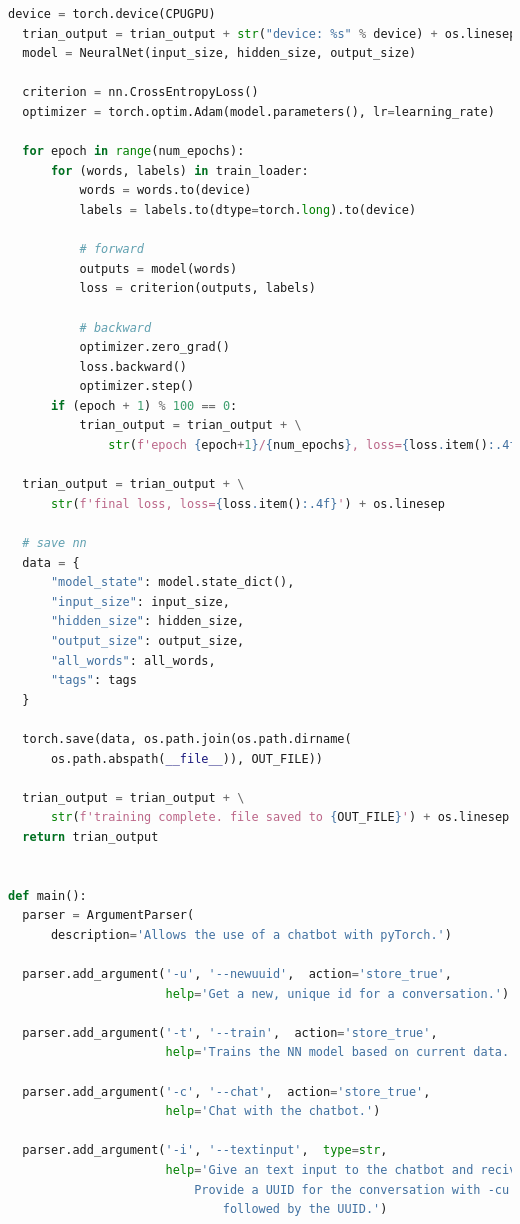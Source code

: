 \documentclass[12pt,oneside,titlepage,listof=totoc,bibliography=totoc]{scrartcl}
\begin{document}
\begin{appendices}
\begin{lstlisting}[language=python]
  device = torch.device(CPUGPU)
  trian_output = trian_output + str("device: %s" % device) + os.linesep
  model = NeuralNet(input_size, hidden_size, output_size)

  criterion = nn.CrossEntropyLoss()
  optimizer = torch.optim.Adam(model.parameters(), lr=learning_rate)

  for epoch in range(num_epochs):
      for (words, labels) in train_loader:
          words = words.to(device)
          labels = labels.to(dtype=torch.long).to(device)

          # forward
          outputs = model(words)
          loss = criterion(outputs, labels)

          # backward
          optimizer.zero_grad()
          loss.backward()
          optimizer.step()
      if (epoch + 1) % 100 == 0:
          trian_output = trian_output + \
              str(f'epoch {epoch+1}/{num_epochs}, loss={loss.item():.4f}') + os.linesep

  trian_output = trian_output + \
      str(f'final loss, loss={loss.item():.4f}') + os.linesep

  # save nn
  data = {
      "model_state": model.state_dict(),
      "input_size": input_size,
      "hidden_size": hidden_size,
      "output_size": output_size,
      "all_words": all_words,
      "tags": tags
  }

  torch.save(data, os.path.join(os.path.dirname(
      os.path.abspath(__file__)), OUT_FILE))

  trian_output = trian_output + \
      str(f'training complete. file saved to {OUT_FILE}') + os.linesep
  return trian_output


def main():
  parser = ArgumentParser(
      description='Allows the use of a chatbot with pyTorch.')

  parser.add_argument('-u', '--newuuid',  action='store_true',
                      help='Get a new, unique id for a conversation.')

  parser.add_argument('-t', '--train',  action='store_true',
                      help='Trains the NN model based on current data.')

  parser.add_argument('-c', '--chat',  action='store_true',
                      help='Chat with the chatbot.')

  parser.add_argument('-i', '--textinput',  type=str,
                      help='Give an text input to the chatbot and recive a answer. \
                          Provide a UUID for the conversation with -cu or --conversationuuid \
                              followed by the UUID.')


\end{lstlisting}
\end{appendices}
\end{document}
